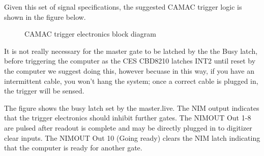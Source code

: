 	 Given this set of signal specifications, the suggested CAMAC
	trigger logic is shown in the figure below.
	 \begin{figure}[htb]
	    \caption{CAMAC trigger electronics block diagram}

	 \end{figure}
	 
	 It is not really necessary for the master gate to be latched by the the Busy latch,
	 before triggering the computer as the CES CBD8210 latches INT2 until reset by the
	 computer we suggest doing this, however becuase in this way, if you have an intermittent
	 cable, you won't hang the system; once a correct cable is plugged in, the trigger
	 will be sensed.
	 
	 The figure shows the busy latch set by the master.live.  The NIM output indicates 
	 that the trigger electronics should inhibit further gates.  
	 The NIMOUT Out 1-8 are pulsed after readout is complete and may be 
	 directly plugged in to digitizer 
	 clear inputs.  The NIMOUT Out 10 (Going ready) clears the NIM latch indicating that the computer
	 is ready for another gate.
	 
